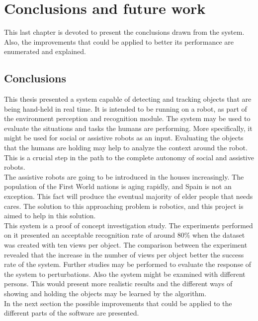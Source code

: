 \chapter{Conclusions and future work}
\label{conclusions}

This last chapter is devoted to present the conclusions drawn from the system. 
Also, the improvements that could be applied to better its performance are enumerated and explained. 

	\section{Conclusions}

	This thesis presented a system capable of detecting and tracking objects that are being hand-held in real time. 
	It is intended to be running on a robot, as part of the environment perception and recognition module. 
	The system may be used to evaluate the situations and tasks the humans are performing. 
	More specifically, it might be used for social or assistive robots as an input. 
	Evaluating the objects that the humans are holding may help to analyze the context around the robot. 
	This is a crucial step in the path to the complete autonomy of social and assistive robots. 
	\\

	The assistive robots are going to be introduced in the houses increasingly. 
	The population of the First World nations is aging rapidly, and Spain is not an exception. 
	This fact will produce the eventual majority of elder people that needs cares. 
	The solution to this approaching problem is robotics, and this project is aimed to help in this solution. 
	\\

	This system is a proof of concept investigation study. 
	The experiments performed on it presented an acceptable recognition rate of around 80\% when the dataset was created with ten views per object. 
	The comparison between the experiment revealed that the increase in the number of views per object better the success rate of the system. 
	Further studies may be performed to evaluate the response of the system to perturbations. 
	Also the system might be examined with different persons. 
	This would present more realistic results and the different ways of showing and holding the objects may be learned by the algorithm. 
	\\


	In the next section the possible improvements that could be applied to the different parts of the software are presented. 


